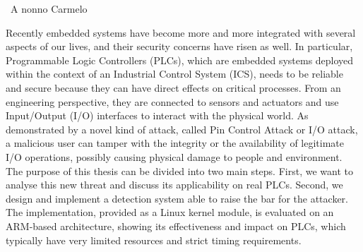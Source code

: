 \documentclass[pdfa,cucitura]{toptesi}
\begin{document}

\TesiDiLaurea{}










\frontespizio
\paginavuota
\newpage

\advance\voffset -5mm
\advance\textheight 30mm


\begin{dedica}
\textdagger\ A nonno Carmelo
\end{dedica}


\sommario

Recently embedded systems have become more and more integrated with several aspects of our lives, and their security concerns have risen as well.
In particular, Programmable Logic Controllers (PLCs), which are embedded systems deployed within the context of an Industrial Control System (ICS),
needs to be reliable and secure because they can have direct effects on critical processes.
From an engineering perspective, they are connected to sensors and actuators and use Input/Output (I/O) interfaces to interact with the physical world.
As demonstrated by a novel kind of attack, called Pin Control Attack or I/O attack, a malicious user can tamper with the integrity or
the availability of legitimate I/O operations, possibly causing physical damage to people and environment.
The purpose of this thesis can be divided into two main steps.
First, we want to analyse this new threat and discuss its applicability on real PLCs.
Second, we design and implement a detection system able to raise the bar for the attacker.
The implementation, provided as a Linux kernel module, is evaluated on an ARM-based architecture,
showing its effectiveness and impact on PLCs, which typically have very limited resources and strict timing requirements.


\ringraziamenti
\end{document}
